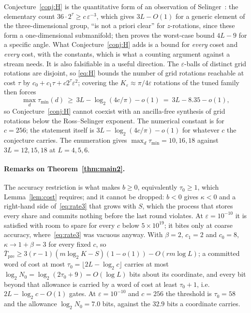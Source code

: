 \documentclass[aps,prx,twocolumn,superscriptaddress,nofootinbib,longbibliography]{revtex4-2}
\theoremstyle{plain}
\theoremstyle{definition}
\theoremstyle{remark}
\newcommand{\Tpre}{T_{\mathrm{pre}}}
\begin{document}
Conjecture~\ref{conj:H} is the quantitative form of an observation of Selinger~\cite[\S9]{Selinger15}: the elementary count $36\cdot2^\tau\ge c\,\varepsilon^{-3}$, which gives $3L-O(1)$ for a generic element of the three-dimensional group, ``is not a priori clear'' for $z$-rotations, since these form a one-dimensional submanifold; \cite[Thm.~30]{Selinger15} then proves the worst-case bound $4L-9$ for a specific angle. What Conjecture~\ref{conj:H} adds is a bound for \emph{every} coset and \emph{every} cost, with the constants, which is what a counting argument against a stream needs. It is also falsifiable in a useful direction. The $\varepsilon$-balls of distinct grid rotations are disjoint, so \eqref{eq:H} bounds the number of grid rotations reachable at cost $\tau$ by $c_0+c_1\tau+c2^\tau\varepsilon^2$; covering the $K_\varepsilon\approx\pi/4\varepsilon$ rotations of the tuned family then forces
\begin{equation}\label{eq:Hcons}
\max_d\tau_{\min}(d)\ \ge\ 3L-\log_2(4c/\pi)-o(1)\ =\ 3L-8.35-o(1),
\end{equation}
so Conjecture~\ref{conj:H} cannot coexist with an ancilla-free synthesis of grid rotations below the Ross--Selinger exponent. The numerical constant is for $c=256$; the statement itself is $3L-\log_2(4c/\pi)-o(1)$ for whatever $c$ the conjecture carries. The enumeration gives $\max_d\tau_{\min}=10,16,18$ against $3L=12,15,18$ at $L=4,5,6$.

\paragraph{Remarks on Theorem~\ref{thm:main2}.}
The accuracy restriction is what makes $b\ge0$, equivalently $\tau_0\ge1$, which Lemma~\ref{lem:cost} requires; and it cannot be dropped: $b<0$ gives $\kappa<0$ and a right-hand side of~\eqref{eq:rate3} that grows with $S$, which the process that stores every share and commits nothing before the last round violates. At $\varepsilon=10^{-10}$ it is satisfied with room to spare for every $c$ below $5\times10^{19}$; it bites only at coarse accuracy, where~\eqref{eq:rate3} was vacuous anyway. With $\beta=2$, $c_1=2$ and $c_0=8$, $\kappa\to1+\beta=3$ for every fixed $c$, so $\bar\Tpre\ge3(r-1)(m\log_2K-S)(1-o(1))-O(rm\log L)$; a committed word of cost at most $\tau_0=\lfloor2L-\log_2c\rfloor$ carries at most $\log_2N_0=\log_2(2\tau_0+9)=O(\log L)$ bits about its coordinate, and every bit beyond that allowance is carried by a word of cost at least $\tau_0+1$, i.e.\ $2L-\log_2c-O(1)$ gates. At $\varepsilon=10^{-10}$ and $c=256$ the threshold is $\tau_0=58$ and the allowance $\log_2N_0=7.0$ bits, against the $32.9$ bits a coordinate carries.
\end{document}
